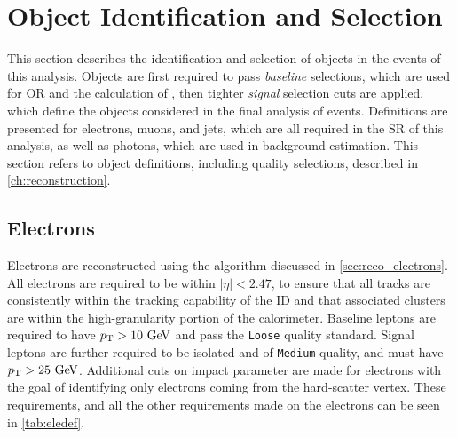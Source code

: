 
\chapter{Object Identification and Selection} %
\label{ch:objects} 

This section describes the identification and selection of objects in the events of this analysis. Objects are first required to pass \textit{baseline} selections, which are used for \acf{OR} and the calculation of \met, then tighter \textit{signal} selection cuts are applied, which define the objects considered in the final analysis of events. Definitions are presented for electrons, muons, and jets, which are all required in the \ac{SR} of this analysis, as well as photons, which are used in background estimation. This section refers to object definitions, including quality selections, described in \autoref{ch:reconstruction}.


\section{Electrons}

Electrons are reconstructed using the algorithm discussed in \autoref{sec:reco_electrons}. All electrons are required to be within $|\eta|<2.47$, to ensure that all tracks are consistently within the tracking capability of the \ac{ID} and that associated clusters are within the high-granularity portion of the calorimeter. Baseline leptons are required to have $\pt>10\gev$ and pass the \texttt{Loose} quality standard. Signal leptons are further required to be isolated and of \texttt{Medium} quality, and must have $\pt>25\gev$. Additional cuts on impact parameter are made for electrons with the goal of identifying only electrons coming from the hard-scatter vertex. These requirements, and all the other requirements made on the electrons can be seen in \autoref{tab:eledef}. 

